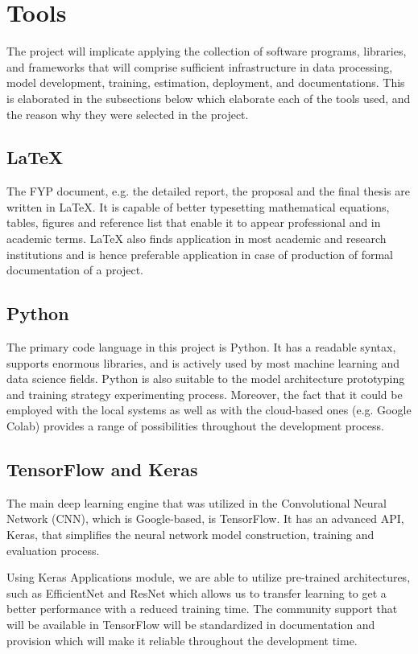 \documentclass[12pt, openany]{report}
\begin{document}
\section{Tools}
The project will implicate applying the collection of software programs, libraries, and frameworks that will comprise sufficient infrastructure in data processing, model development, training, estimation, deployment, and documentations. This is elaborated in the subsections below which elaborate each of the tools used, and the reason why they were selected in the project.
\subsection{LaTeX}
The FYP document, e.g. the detailed report, the proposal and the final thesis are written in LaTeX. It is capable of better typesetting mathematical equations, tables, figures and reference list that enable it to appear professional and in academic terms. LaTeX also finds application in most academic and research institutions and is hence preferable application in case of production of formal documentation of a project.
\subsection{Python}
The primary code language in this project is Python. It has a readable syntax, supports enormous libraries, and is actively used by most machine learning and data science fields. Python is also suitable to the model architecture prototyping and training strategy experimenting process. Moreover, the fact that it could be employed with the local systems as well as with the cloud-based ones (e.g. Google Colab) provides a range of possibilities throughout the development process.
\subsection{TensorFlow and Keras}
The main deep learning engine that was utilized in the Convolutional Neural Network (CNN), which is Google-based, is TensorFlow. It has an advanced API, Keras, that simplifies the neural network model construction, training and evaluation process.

Using Keras Applications module, we are able to utilize pre-trained architectures, such as EfficientNet and ResNet which allows us to transfer learning to get a better performance with a reduced training time. The community support that will be available in TensorFlow will be standardized in documentation and provision which will make it reliable throughout the development time.
\end{document}
